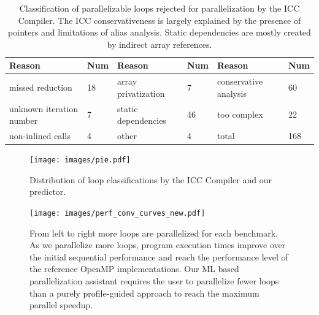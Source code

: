 \begin{table}
  \tabulinesep=2pt
  \begin{minipage}{\columnwidth}
  \begin{center}
    \begin{tabu}{M{3cm}M{0.5cm}M{3cm}M{0.5cm}M{3cm}M{0.5cm}}
      \hline
      \rowfont{\bfseries}
      Reason & Num & Reason & Num & Reason & Num\\\hline
      missed reduction & 18 & array privatization & 7 & conservative analysis & 60\\\hline
      unknown iteration number & 7 & static dependencies & 46 & too complex & 22\\\hline
      non-inlined calls & 4 & other & 4 & total & 168\\\hline
    \end{tabu}
  \end{center}
  \end{minipage}
  \caption{Classification of parallelizable loops rejected for parallelization by the ICC Compiler. The ICC conservativeness is largely explained by the presence of pointers and limitations of alias analysis. Static dependencies are mostly created by indirect array references.}
  \label{tab:icc_missed_opportunities}
  \vspace*{-5mm}
\end{table}%
\begin{figure}[t!]
    \centering
    \texttt{[image: images/pie.pdf]}
    \caption{
      Distribution of loop classifications by the ICC Compiler and our predictor.}
    \label{fig:icc_competition}
\vspace*{-5mm}
\end{figure}
\begin{figure}[t!]
\centering
\texttt{[image: images/perf\_conv\_curves\_new.pdf]}
\caption{From left to right more loops are parallelized for each benchmark. As we parallelize more loops, program execution times improve over the initial sequential performance and reach the performance level of the reference OpenMP implementations. Our ML based parallelization assistant requires the user to parallelize fewer loops than a purely profile-guided approach to reach the maximum parallel speedup.}
\label{fig:performance_convergence_line}
\vspace*{5mm} %
\end{figure}
